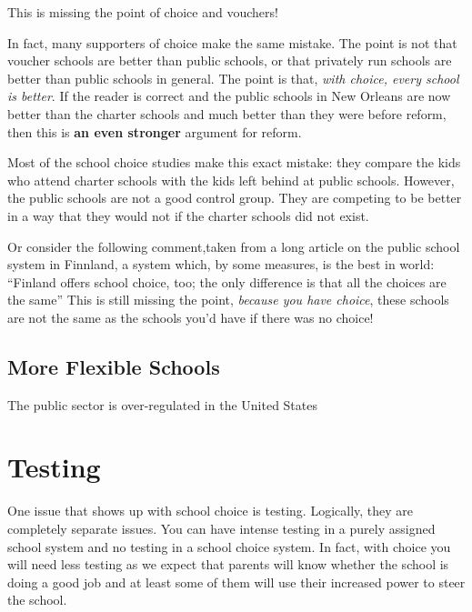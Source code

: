 This is missing the point of choice and vouchers!

In fact, many supporters of choice make the same mistake. The point is not that
voucher schools are better than public schools, or that privately run schools
are better than public schools in general. The point is that, \emph{with
choice, every school is better}. If the reader is correct and the public
schools in New Orleans are now better than the charter schools and much better
than they were before reform, then this is \textbf{an even stronger} argument
for reform.

Most of the school choice studies make this exact mistake: they compare the
kids who attend charter schools with the kids left behind at public schools.
However, the public schools are not a good control group. They are competing to
be better in a way that they would not if the charter schools did not exist.

Or consider the following comment,taken from a long article on the public
school system in Finnland,
a system which, by some measures, is the best in world: ``Finland offers school
choice, too; the only difference is that all the choices are the same''
This is still missing the point, \emph{because you have choice}, these schools
are not the same as the schools you'd have if there was no choice!


\subsection{More Flexible Schools}

The public sector is over-regulated in the United States

\section{Testing}


One issue that shows up with school choice is testing. Logically, they are
completely separate issues. You can have intense testing in a purely assigned
school system and no testing in a school choice system. In fact, with choice
you will need less testing as we expect that parents will know whether the
school is doing a good job and at least some of them will use their increased
power to steer the school.

